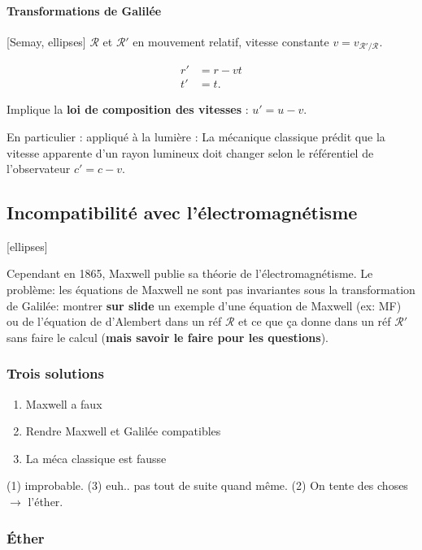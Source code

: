 \documentclass[11pt]{report}
\numberwithin{figure}{section}
\numberwithin{equation}{section}
\numberwithin{table}{section}
\newcommand{\rf}{\mathcal{R}}
\newcommand{\1}{\boldsymbol{1}}
\begin{document}
\paragraph{Transformations de Galilée}


[Semay, ellipses] $\rf$ et $\rf'$ en mouvement relatif, vitesse constante $v = v_{\rf'/\rf}$.

\begin{align*}
r' &= r - vt \\
t' &= t.
\end{align*}

Implique la \textbf{loi de composition des vitesses} : $u' = u - v$.   

En particulier : appliqué à la lumière : La mécanique classique prédit que la vitesse apparente d’un rayon lumineux doit changer selon le référentiel de l’observateur $c' = c - v$.

\subsection{Incompatibilité avec l'électromagnétisme}

[ellipses]

Cependant en 1865, Maxwell publie sa théorie de l’électromagnétisme. Le problème: les équations de Maxwell ne sont pas invariantes sous la transformation de Galilée: montrer \textbf{sur slide} un exemple d'une équation de Maxwell (ex: MF) ou de l'équation de d'Alembert dans un réf $\rf$ et ce que ça donne dans un réf $\rf'$ sans faire le calcul (\textbf{mais savoir le faire pour les questions}).

\subsubsection{Trois solutions}

\begin{enumerate}
\item Maxwell a faux
\item Rendre Maxwell et Galilée compatibles
\item La méca classique est fausse
\end{enumerate}

(1) improbable. (3) euh.. pas tout de suite quand même. (2) On tente des choses $\rightarrow$ l'éther.

\subsubsection{Éther}
\end{document}

